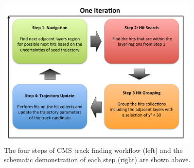 \begin{figure}[hbtp]
\begin{center}
\includegraphics[width=0.900\textwidth]{Figures/Chapter3/TrackFDWF.pdf}
\caption{The four steps of CMS track finding workflow (left) and the schematic demonstration of each step (right) are shown above.}
\label{CMSTrackFDWF}
\end{center}
\end{figure} 


